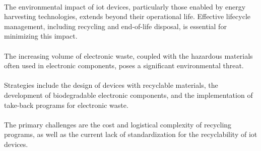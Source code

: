         \paragraph{}
        The environmental impact of \gls{iot} devices, particularly those enabled by energy harvesting technologies, extends beyond their operational life. Effective lifecycle management, including recycling and end-of-life disposal, is essential for minimizing this impact.
        
        \paragraph{}
        The increasing volume of electronic waste, coupled with the hazardous materials often used in electronic components, poses a significant environmental threat\cite{iotSustainableEnergySystems}.
        
        \paragraph{}
        Strategies include the design of devices with recyclable materials, the development of biodegradable electronic components, and the implementation of take-back programs for electronic waste.
        
        \paragraph{}
        The primary challenges are the cost and logistical complexity of recycling programs, as well as the current lack of standardization for the recyclability of \gls{iot} devices.
